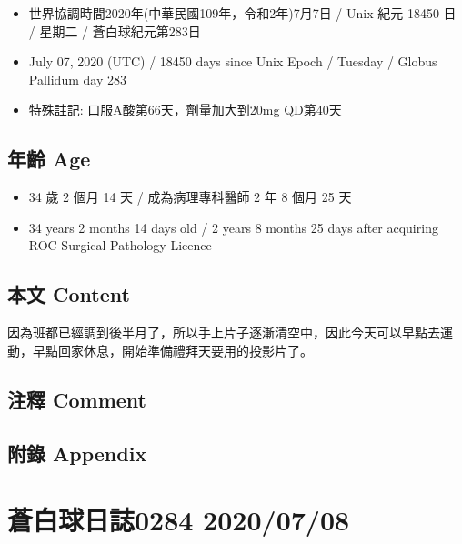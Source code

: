 \documentclass[a5paper, 11pt
]{book}
\providecommand{\tightlist}{%
  \setlength{\itemsep}{0pt}\setlength{\parskip}{0pt}}
\begin{document}
\begin{itemize}
\tightlist
\item
  世界協調時間2020年(中華民國109年，令和2年)7月7日 / Unix 紀元 18450 日
  / 星期二 / 蒼白球紀元第283日
\item
  July 07, 2020 (UTC) / 18450 days since Unix Epoch / Tuesday / Globus
  Pallidum day 283
\item
  特殊註記: 口服A酸第66天，劑量加大到20mg QD第40天
\end{itemize}

\hypertarget{ux5e74ux9f61-age-32}{%
\subsection{年齡 Age}\label{ux5e74ux9f61-age-32}}

\begin{itemize}
\tightlist
\item
  34 歲 2 個月 14 天 / 成為病理專科醫師 2 年 8 個月 25 天
\item
  34 years 2 months 14 days old / 2 years 8 months 25 days after
  acquiring ROC Surgical Pathology Licence
\end{itemize}

\hypertarget{ux672cux6587-content-32}{%
\subsection{本文 Content}\label{ux672cux6587-content-32}}

因為班都已經調到後半月了，所以手上片子逐漸清空中，因此今天可以早點去運動，早點回家休息，開始準備禮拜天要用的投影片了。

\hypertarget{ux6ce8ux91cb-comment-32}{%
\subsection{注釋 Comment}\label{ux6ce8ux91cb-comment-32}}

\hypertarget{ux9644ux9304-appendix-32}{%
\subsection{附錄 Appendix}\label{ux9644ux9304-appendix-32}}

\hypertarget{ux84bcux767dux7403ux65e5ux8a8c0284-20200708}{%
\section{蒼白球日誌0284
2020/07/08}\label{ux84bcux767dux7403ux65e5ux8a8c0284-20200708}}
\end{document}

